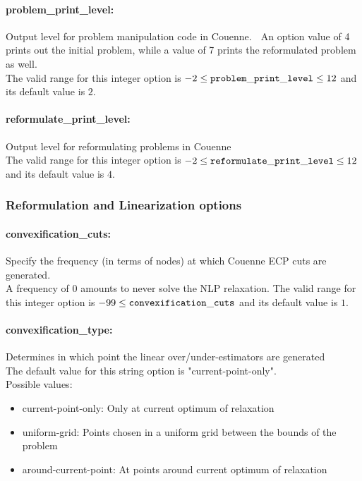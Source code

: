 \paragraph{problem\_print\_level:}\label{sec:problem_print_level} Output level for problem manipulation code in Couenne. $\;$ An option value of 4 prints out the initial problem, while a value of 7 prints the reformulated problem as well.\\
 The valid range for this integer option is
$-2 \le {\tt problem\_print\_level } \le 12$
and its default value is $2$.

\paragraph{reformulate\_print\_level:}\label{sec:reformulate_print_level} Output level for reformulating problems in Couenne $\;$ \\
 The valid range for this integer option is
$-2 \le {\tt reformulate\_print\_level } \le 12$
and its default value is $4$.

\subsubsection{Reformulation and Linearization options}


\paragraph{convexification\_cuts:}\label{sec:convexification_cuts} Specify the frequency (in terms of nodes) at which Couenne ECP cuts are generated. $\;$ \\
A frequency of 0 amounts to never solve the NLP relaxation. The valid range for this integer option is
$-99 \le {\tt convexification\_cuts}$
and its default value is $1$.


\paragraph{convexification\_type:}\label{sec:convexification_type} Determines in which point the linear over/under-estimators are generated $\;$ \\
The default value for this string option is "current-point-only". \\
Possible values:
\begin{itemize}
   \item current-point-only: Only at current optimum of relaxation
   \item uniform-grid: Points chosen in a uniform grid between the bounds of the problem
   \item around-current-point: At points around current optimum of relaxation
\end{itemize}

